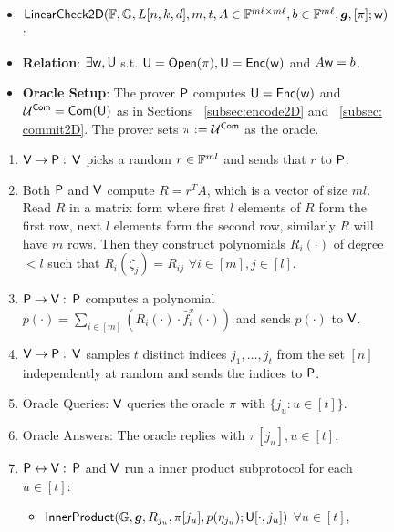\begin{figure}[h!]
	\centering
	\begin{framed}
		\begin{itemize}
			\item {$\mathsf{LinearCheck2D} (\mathbb{F}, \mathbb{G}, L[n,k,d], m, t, A \in \mathbb{F}^{m\ell \times m\ell}, b\in \mathbb{F}^{m\ell}, \bm{g}, [\pi]; \mathsf{w})$}:
			\item {\bf Relation}: $\exists \mathsf{w}, \mathsf{U}$ s.t. $\mathsf{U} = \mathsf{Open}(\pi), \mathsf{U} = \mathsf{Enc}(\mathsf{w})$ and $A\mathsf{w} = b$. 
			\item {\bf Oracle Setup}: The prover $\mathsf{P}$ computes $\mathsf{U} = \mathsf{Enc}(\mathsf{w})$ and $\mathcal{U}^{\mathsf{Com}} = \mathsf{Com}(\mathsf{U})$ as in Sections ~\ref{subsec:encode2D} and ~\ref{subsec: commit2D}. The prover sets $\pi := \mathcal{U}^{\mathsf{Com}}$ as the oracle.
		\end{itemize}
		\begin{enumerate}[{\rm 1.}]
			\item $\mathsf{V} \rightarrow \mathsf{P}: $ $\mathsf{V}$ picks a random $r\in \mathbb{F}^{ml}$ and sends that $r$ to $\mathsf{P}$.
			
			\item Both $\mathsf{P}$ and $\mathsf{V}$ compute $R=r^TA$, which is a vector of size $ml$. Read $R$ in a matrix form where first $l$ elements of $R$ form the first row, next $l$ elements form the second row, similarly $R$ will have $m$ rows. Then they construct polynomials $R_i(\cdot)$ of degree $<l$ such that $R_i(\zeta_j)=R_{ij}$ $\forall i\in [m], j\in [l]$. 
			
			\item $\mathsf{P} \rightarrow \mathsf{V}: $  $\mathsf{P}$ computes a polynomial $p(\cdot)=\sum_{i\in[m]} ( R_i(\cdot)\cdot \hat{f}^x_i(\cdot))$ and sends $p(\cdot)$ to $\mathsf{V}$.
			
			\item $\mathsf{V} \rightarrow \mathsf{P}: $ $\mathsf{V}$ samples $t$ distinct  indices $j_1,\ldots,j_t$ from the set $[n]$ independently at random and sends the indices to $\mathsf{P}$.
			
			\item Oracle Queries: $\mathsf{V}$ queries the oracle $\pi$ with $\{j_u : u\in [t]\}$.
			
			\item Oracle Answers: The oracle replies with $\pi[j_u], u\in [t]$.
			
			\item $\mathsf{P} \leftrightarrow \mathsf{V}: $ $\mathsf{P}$ and $\mathsf{V}$ run a inner product subprotocol for each $u\in[t]$:
			\begin{itemize}
				\item $\mathsf{InnerProduct}(\mathbb{G},\bm{g}, R_{j_u}, \pi[j_u], p(\eta_{j_u}); \mathsf{U}[\cdot,j_u])$ $\forall u\in [t]$,
				

\end{itemize}
\end{enumerate}
\end{framed}
\end{figure}
